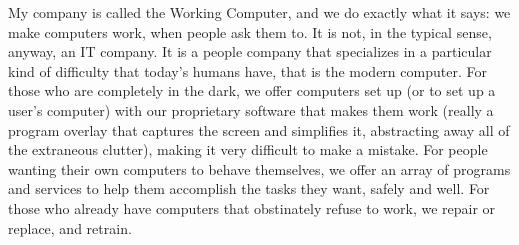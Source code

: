        My company is called the Working Computer, and we do exactly what it says: we make computers work, when people ask them to. It is not, in the typical sense, anyway, an IT company. It is a people company that specializes in a particular kind of difficulty that today's humans have, that is the modern computer. For those who are completely in the dark, we offer computers set up (or to set up a user's computer) with our proprietary software that makes them work (really a program overlay that captures the screen and simplifies it, abstracting away all of the extraneous clutter), making it very difficult to make a mistake. For people wanting their own computers to behave themselves, we offer an array of programs and services to help them accomplish the tasks they want, safely and well. For those who already have computers that obstinately refuse to work, we repair or replace, and retrain.
